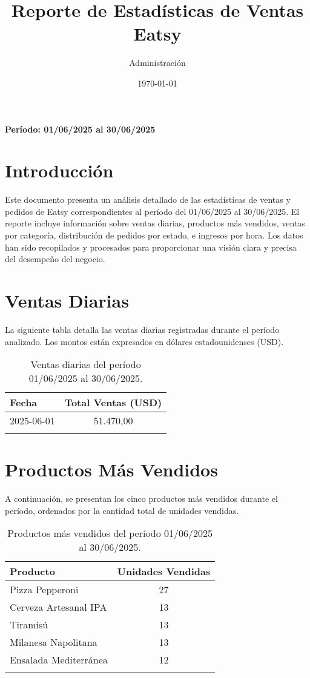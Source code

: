 \documentclass[a4paper,11pt]{article}
\title{Reporte de Estadísticas de Ventas \\ Eatsy}
\author{Administración}
\date{\today}
\begin{document}
\maketitle
\vspace{1cm}
\begin{center}
    \textbf{Período: 01/06/2025 al 30/06/2025}
\end{center}
\vspace{2cm}

\tableofcontents
\newpage

\section{Introducción}
Este documento presenta un análisis detallado de las estadísticas de ventas y pedidos de Eatsy correspondientes al período del 01/06/2025 al 30/06/2025. El reporte incluye información sobre ventas diarias, productos más vendidos, ventas por categoría, distribución de pedidos por estado, e ingresos por hora. Los datos han sido recopilados y procesados para proporcionar una visión clara y precisa del desempeño del negocio.

\section{Ventas Diarias}
La siguiente tabla detalla las ventas diarias registradas durante el período analizado. Los montos están expresados en dólares estadounidenses (USD).

\begin{longtable}{lc}
    \toprule
    \textbf{Fecha} & \textbf{Total Ventas (USD)} \\
    \midrule
            2025-06-01 & 51.470,00 \\
        \bottomrule
    \caption{Ventas diarias del período 01/06/2025 al 30/06/2025.}
    \label{tab:ventas_diarias}
\end{longtable}

\section{Productos Más Vendidos}
A continuación, se presentan los cinco productos más vendidos durante el período, ordenados por la cantidad total de unidades vendidas.

\begin{longtable}{lc}
    \toprule
    \textbf{Producto} & \textbf{Unidades Vendidas} \\
    \midrule
            Pizza Pepperoni & 27 \\
            Cerveza Artesanal IPA & 13 \\
            Tiramisú & 13 \\
            Milanesa Napolitana & 13 \\
            Ensalada Mediterránea & 12 \\
        \bottomrule
    \caption{Productos más vendidos del período 01/06/2025 al 30/06/2025.}
    \label{tab:mas_vendidos}
\end{longtable}
\end{document}
